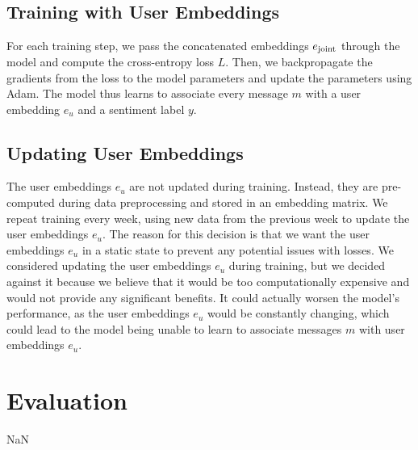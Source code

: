 \documentclass{article}
\begin{document}
\subsection{Training with User Embeddings}
For each training step, we pass the concatenated embeddings $e_\textnormal{joint}$ through the model and compute the cross-entropy loss $L$. Then, we backpropagate the gradients from the loss to the model parameters and update the parameters using Adam. The model thus learns to associate every message $m$ with a user embedding $e_u$ and a sentiment label $y$.

\subsection{Updating User Embeddings}
The user embeddings $e_u$ are not updated during training. Instead, they are pre-computed during data preprocessing and stored in an embedding matrix. We repeat training every week, using new data from the previous week to update the user embeddings $e_u$. The reason for this decision is that we want the user embeddings $e_u$ in a static state to prevent any potential issues with losses. We considered updating the user embeddings $e_u$ during training, but we decided against it because we believe that it would be too computationally expensive and would not provide any significant benefits. It could actually worsen the model's performance, as the user embeddings $e_u$ would be constantly changing, which could lead to the model being unable to learn to associate messages $m$ with user embeddings $e_u$.

\section{Evaluation}
NaN
\end{document}
